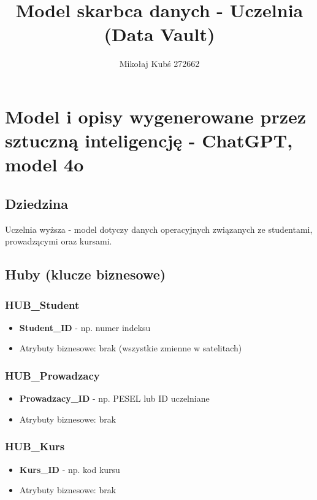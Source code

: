 \documentclass{article}
\title{Model skarbca danych - Uczelnia (Data Vault)}
\author{Mikołaj Kubś 272662}
\date{}
\begin{document}
\maketitle

\section{Model i opisy wygenerowane przez sztuczną inteligencję - ChatGPT, model 4o}

\subsection{Dziedzina}

Uczelnia wyższa - model dotyczy danych operacyjnych związanych ze studentami, prowadzącymi oraz kursami.

\subsection{Huby (klucze biznesowe)}

\subsubsection*{HUB\_Student}
\begin{itemize}
  \item \textbf{Student\_ID} - np. numer indeksu
  \item Atrybuty biznesowe: brak (wszystkie zmienne w satelitach)
\end{itemize}

\subsubsection*{HUB\_Prowadzacy}
\begin{itemize}
  \item \textbf{Prowadzacy\_ID} - np. PESEL lub ID uczelniane
  \item Atrybuty biznesowe: brak
\end{itemize}

\subsubsection*{HUB\_Kurs}
\begin{itemize}
  \item \textbf{Kurs\_ID} - np. kod kursu
  \item Atrybuty biznesowe: brak
\end{itemize}
\end{document}
